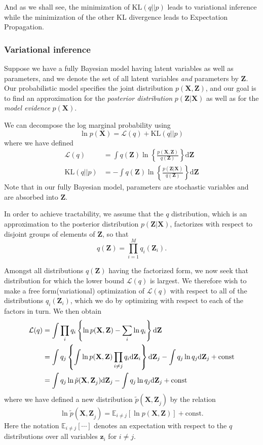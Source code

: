 \documentclass[a4paper]{book}
\newcommand{\ud}{\mathrm{d}}
\newcommand{\up}{\mathrm}
\renewcommand{\bf}{\mathbf}
\renewcommand{\cal}{\mathcal}
\newcommand{\bb}{\mathbb}
\newcommand{\imp}[1]{\textit{#1}}
\begin{document}
And as we shall see, the minimization of $\up{KL}(q||p)$ leads to variational inference while the minimization of the other KL divergence leads to Expectation Propagation.
\subsubsection{Variational inference}
Suppose we have a fully Bayesian model having latent variables as well as parameters, and we denote the set of all latent variables \imp{and} parameters by $\bf{Z}$. Our probabilistic model specifies the joint distribution $p(\bf{X,Z})$, and our goal is to find an approximation for the \imp{posterior distribution} $p(\bf{Z|X})$ as well as for the \imp{model evidence} $p(\bf{X})$.

We can decompose the log marginal probability using
\begin{equation}
	\ln p(\bf{X}) = \cal{L}(q) + \up{KL}(q||p)
\end{equation}
where we have defined
\begin{align}
	\cal{L}(q) &= \int q(\bf{Z})\ln\left\{ \frac{p(\bf{X,Z})}{q(\bf{Z})} \right\} \ud \bf{Z}\\
	\up{KL}(q||p) &= - \int q(\bf{Z}) \ln \left\{  \frac{p(\bf{Z|X})}{q(\bf{Z})}  \right\} \ud \bf{Z}
\end{align}
Note that in our fully Bayesian model, parameters are stochastic variables and are absorbed into $\bf{Z}$. 

In order to achieve tractability, we assume that the $q$ distribution, which is an approximation to the posterior distribution $p(\bf{Z|X})$, factorizes with respect to disjoint groups of elements of $\bf{Z}$, so that
\begin{equation}
	q(\bf{Z}) = \prod_{i=1}^M q_i(\bf{Z}_i).
\end{equation}

Amongst all distributions $q(\bf{Z})$ having the factorized form, we now seek that distribution for which the lower bound $\cal{L}(q)$ is largest. We therefore wish to make a free form(variational) optimization of $\cal{L}(q)$ with respect to all of  the distributions $q_i(\bf{Z}_i)$, which we do by optimizing with respect to each of the factors in turn. We then obtain
\begin{align}
	\cal{L}(q) &= \int \prod_i q_i \left\{ \ln p(\bf{X,Z}) - \sum_i \ln q_i \right\} \ud \bf{Z} \notag \\
	&= \int q_j \left\{ \int \ln p(\bf{X,Z})\prod_{i \neq j} q_i \ud \bf{Z}_i \right\} \ud \bf{Z}_j - \int q_j \ln q_j \ud \bf{Z}_j + \text{const} \notag \\
	&= \int q_j \ln \tilde{p}(\bf{X,Z}_j)\ud \bf{Z}_j - \int q_j \ln q_j \ud \bf{Z}_j + \up{const}
\end{align}
where we have defined a new distribution $\tilde{p}(\bf{X,Z}_j)$ by the relation
\begin{equation}
	\ln \tilde{p}(\bf{X,Z}_j) = \bb{E}_{i \neq j}[\ln p(\bf{X,Z})] + \up{const}.
\end{equation}
Here the notation $\bb{E}_{i \neq j}[\cdots]$ denotes an expectation with respect to the $q$ distributions over all variables $\bf{z}_i$ for $i \neq j$.
\end{document}
